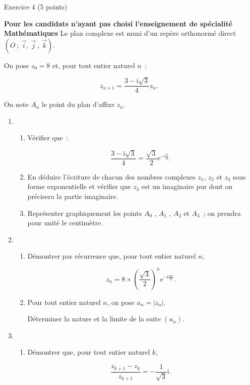 
\begin{h2}Exercice 4 (5 points)\end{h2}
\textbf{Pour les candidats n'ayant pas choisi l'enseignement de spécialité \og Mathématiques \fg{} }
\bigbreak
Le plan complexe est muni d'un repère orthonormé direct $(O~;~\overrightarrow{i},~\overrightarrow{j}~,~\overrightarrow{k})$.
\par
On pose $z_0 = 8$ et, pour tout entier naturel $n$~:
\par
\[z_{n+1} = \dfrac{3 - \text{i}\sqrt{3}}{4}z_n.\]
\par
On note $A_n$ le point du plan d'affixe $z_n$.
\medbreak
\begin{enumerate}
     \item
     \begin{enumerate}[label=\alph*.]
          \item Vérifier que~:
          \par
          \[\dfrac{3 - \text{i}\sqrt{3}}{4} = \dfrac{\sqrt{3}}{2}\text{e}^{- \text{i}\frac{\pi}{6}}.\]
          \item En déduire l'écriture de chacun des nombres complexes $z_1$,  $z_2$ et $z_3$ sous forme exponentielle et vérifier que $z_3$ est un imaginaire pur dont on précisera la partie imaginaire.
          \item Représenter graphiquement les points $A_0$ , $A_1$ , $A_2$ et $A_3$~; on prendra pour unité le centimètre.
     \end{enumerate}
     \item
     \begin{enumerate}[label=\alph*.]
          \item Démontrer par récurrence que, pour tout entier naturel $n$,
          \par
          \[z_n = 8 \times \left(\dfrac{\sqrt{3}}{2}\right)^n \text{e}^{- \text{i}\frac{n\pi}{6}}.\]
          \item Pour tout entier naturel $n$, on pose $u_n = \left|z_n\right|$.
          \par
          Déterminer la nature et la limite de la suite $\left(u_n\right)$.
     \end{enumerate}
     \item
     \begin{enumerate}[label=\alph*.]
          \item Démontrer que, pour tout entier naturel $k$,
          \par
          \[\dfrac{z_{k+1} - z_{k}}{z_{k+1}} = - \dfrac{1}{\sqrt{3}}\text{i}.\]

\end{enumerate}
\end{enumerate}
